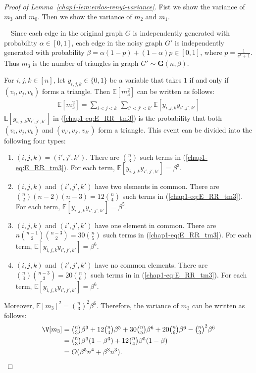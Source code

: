 \begin{proof}[Proof of Lemma~\ref{chap1-lem:erdos-renyi-variance}]
Fist we show the variance of $m_3$ and $m_0$. 
Then we show the variance of $m_2$ and $m_1$.

\smallskip
{}~~Since each edge in the original graph $G$ is independently generated with probability $\alpha \in [0,1]$, each edge in the noisy graph $G'$ is independently generated with probability $\beta = \alpha (1-p) + (1 - \alpha) p \in [0,1]$, where $p=\frac{1}{e^\epsilon+1}$. 
Thus $m_3$ is the number of triangles in graph $G' \sim \textbf{G}(n,\beta)$.

For $i,j,k \in [n]$, let $y_{i,j,k} \in \{0,1\}$ be a variable that takes $1$ if and only if 
$(v_i, v_j, v_k)$ forms a triangle. 
Then $\mathbb{E}[m_3^2]$ can be written as follows:
\begin{align}
  \mathbb{E}[m_3^2] = \sum_{i<j<k} ~ \sum_{i'<j'<k'}
  \mathbb{E}[y_{i,j,k} y_{i',j',k'}] 
  \label{chap1-eq:E_RR_tm3}
\end{align}
$\mathbb{E}[y_{i,j,k} y_{i',j',k'}]$ in (\ref{chap1-eq:E_RR_tm3}) is the probability that both $(v_i,v_j,v_k)$ and $(v_{i'},v_{j'},v_{k'})$ form a triangle. 
This event can be divided into the following four types:
\begin{enumerate}
\item $(i,j,k)=(i',j',k')$. There are $\binom{n}{3}$ such terms in (\ref{chap1-eq:E_RR_tm3}). 
For each term, $\mathbb{E}[y_{i,j,k} y_{i',j',k'}] = \beta^3$.
\item $(i,j,k)$ and $(i',j',k')$ have two elements in common. 
There are $\binom{n}{2} (n-2) (n-3) = 12\binom{n}{4}$ such terms in (\ref{chap1-eq:E_RR_tm3}). 
For each term, $\mathbb{E}[y_{i,j,k} y_{i',j',k'}] = \beta^5$. 
\item $(i,j,k)$ and $(i',j',k')$ have one element in common. 
There are $n \binom{n-1}{2} \binom{n-3}{2} = 30\binom{n}{5}$ such terms in (\ref{chap1-eq:E_RR_tm3}). 
For each term, $\mathbb{E}[y_{i,j,k} y_{i',j',k'}] = \beta^6$. 
\item $(i,j,k)$ and $(i',j',k')$ have no common elements. 
There are $\binom{n}{3} \binom{n-3}{3} = 20\binom{n}{6}$ such terms in in (\ref{chap1-eq:E_RR_tm3}). 
For each term, $\mathbb{E}[y_{i,j,k} y_{i',j',k'}] = \beta^6$. 
\end{enumerate}
Moreover, $\mathbb{E}[m_3]^2 = \binom{n}{3}^2 \beta^6$. 
Therefore, the variance of $m_3$ can be written as follows:
\begin{align*}
    \V[m_3] 
    &= \textstyle{\binom{n}{3} \beta^3 + 12\binom{n}{4} \beta^5 + 30\binom{n}{5} \beta^6 + 20\binom{n}{6} \beta^6 - \binom{n}{3}^2 \beta^6} \\
    &= \textstyle{\binom{n}{3} \beta^3 (1-\beta^3) + 12\binom{n}{4}\beta^5(1-\beta)} \\
    &= O(\beta^5 n^4 + \beta^3 n^3).
\end{align*}


\end{proof}
